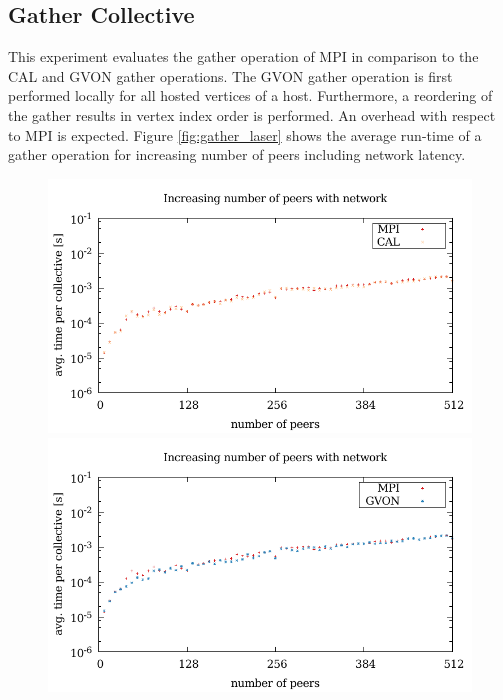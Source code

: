\subsection*{Gather Collective}
This experiment evaluates the gather operation of MPI in comparison to
the CAL and GVON gather operations.  The GVON gather operation is
first performed locally for all hosted vertices of a
host. Furthermore, a reordering of the gather results in vertex index
order is performed. An overhead with respect to MPI is expected.
Figure \ref{fig:gather_laser} shows the average run-time of a gather
operation for increasing number of peers including network latency.

\begin{figure}[H]
  \begin{minipage}[t]{0.5\textwidth}
    \includegraphics[width=\textwidth]{plots/50_collective_network_cal_laser}
    \includegraphics[width=\textwidth]{plots/50_collective_network_gvon_laser}

\end{minipage}
\end{figure}
